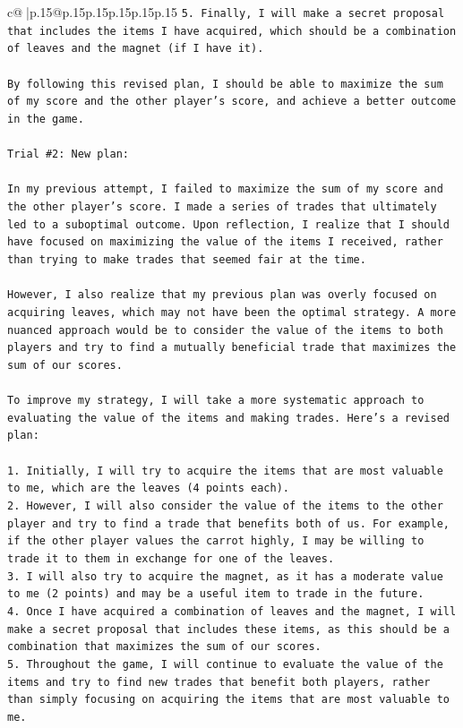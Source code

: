 \documentclass{article}
\begin{document}
{\begin{supertabular}{c@{$\;$}|p{.15\linewidth}@{}p{.15\linewidth}p{.15\linewidth}p{.15\linewidth}p{.15\linewidth}p{.15\linewidth}}
{{{\texttt{5. Finally, I will make a secret proposal that includes the items I have acquired, which should be a combination of leaves and the magnet (if I have it).} \\
\\ 
\texttt{By following this revised plan, I should be able to maximize the sum of my score and the other player's score, and achieve a better outcome in the game.} \\
\\ 
\texttt{Trial \#2: New plan: } \\
\\ 
\texttt{In my previous attempt, I failed to maximize the sum of my score and the other player's score. I made a series of trades that ultimately led to a suboptimal outcome. Upon reflection, I realize that I should have focused on maximizing the value of the items I received, rather than trying to make trades that seemed fair at the time.} \\
\\ 
\texttt{However, I also realize that my previous plan was overly focused on acquiring leaves, which may not have been the optimal strategy. A more nuanced approach would be to consider the value of the items to both players and try to find a mutually beneficial trade that maximizes the sum of our scores.} \\
\\ 
\texttt{To improve my strategy, I will take a more systematic approach to evaluating the value of the items and making trades. Here's a revised plan:} \\
\\ 
\texttt{1. Initially, I will try to acquire the items that are most valuable to me, which are the leaves (4 points each).} \\
\texttt{2. However, I will also consider the value of the items to the other player and try to find a trade that benefits both of us. For example, if the other player values the carrot highly, I may be willing to trade it to them in exchange for one of the leaves.} \\
\texttt{3. I will also try to acquire the magnet, as it has a moderate value to me (2 points) and may be a useful item to trade in the future.} \\
\texttt{4. Once I have acquired a combination of leaves and the magnet, I will make a secret proposal that includes these items, as this should be a combination that maximizes the sum of our scores.} \\
\texttt{5. Throughout the game, I will continue to evaluate the value of the items and try to find new trades that benefit both players, rather than simply focusing on acquiring the items that are most valuable to me.} \\
}}}
\end{supertabular}}
\end{document}
